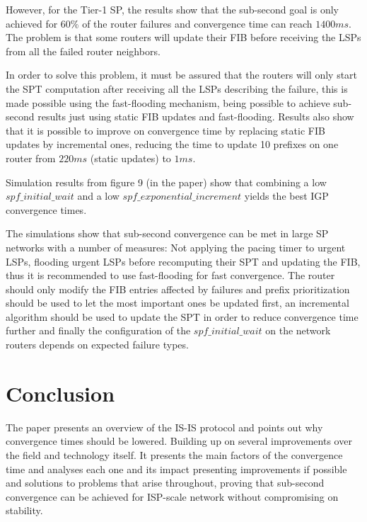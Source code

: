 \documentclass[a4paper, 11pt]{article}
\begin{document}
However, for the Tier-1 SP, the results show that the sub-second goal is only achieved for $60\%$ of the router failures and convergence time can reach $1400ms$.
The problem is that some routers will update their FIB before receiving the LSPs from all the failed router neighbors.

In order to solve this problem, it must be assured that the routers will only start the SPT computation after receiving all the LSPs describing the failure, this is made possible using the fast-flooding mechanism, being possible to achieve sub-second results just using static FIB updates and fast-flooding. 
Results also show that it is possible to improve on convergence time by replacing static FIB updates by incremental ones, reducing the time to update 10 prefixes on one router from $220ms$ (static updates) to $1ms$.

Simulation results from figure 9 (in the paper) show that combining a low $spf\_initial\_wait$ and a low $spf\_exponential\_increment$ yields the best IGP convergence times.

The simulations show that sub-second convergence can be met in large SP networks with a number of measures:
Not applying the pacing timer to urgent LSPs, flooding urgent LSPs before recomputing their SPT and updating the FIB, thus it is recommended to use fast-flooding for fast convergence.
The router should only modify the FIB entries affected by failures and prefix prioritization should be used to let the most important ones be updated first, an incremental algorithm should be used to update the SPT in order to reduce convergence time further and finally the configuration of the $spf\_initial\_wait$ on the network routers depends on expected failure types.

\section{Conclusion}
The paper presents an overview of the IS-IS protocol and points out why convergence times should be lowered. 
Building up on several improvements over the field and technology itself.
It presents the main factors of the convergence time and analyses each one and its impact presenting improvements if possible and solutions to problems that arise throughout, proving that sub-second convergence can be achieved for ISP-scale network without compromising on stability.
\end{document}
